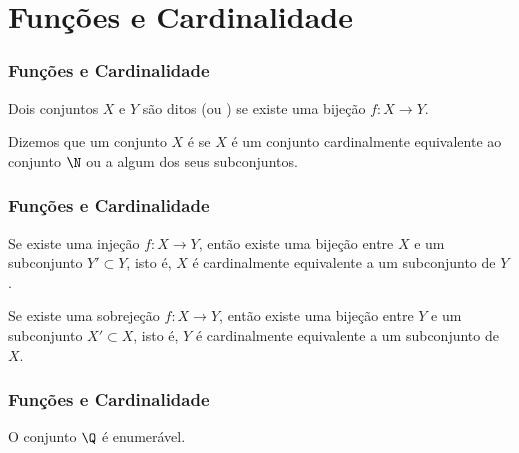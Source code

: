 \documentclass[brazil, notheorems, 10pt]{beamer}
\begin{document}
\section{Funções e Cardinalidade}
\begin{frame}
\frametitle{Funções e Cardinalidade} %

\begin{definicao}
Dois conjuntos $X$ e $Y$ são ditos 
(ou ) se existe uma bijeção $f : X \to Y$.
\end{definicao}

\begin{definicao}
Dizemos que um conjunto $X$ é  se $X$ é um conjunto
cardinalmente equivalente ao conjunto $\N$ ou a algum dos seus
subconjuntos.
\end{definicao}


\end{frame}




\begin{frame}
\frametitle{Funções e Cardinalidade} %

\begin{teorema}
Se existe uma injeção $f: X \to Y$, então existe uma bijeção entre
$X$ e um subconjunto $Y' \subset Y$, isto é, $X$ é cardinalmente
equivalente a um subconjunto de $Y$.
\end{teorema} \pause

\begin{teorema}
Se existe uma sobrejeção $f : X \to Y$, então existe uma bijeção
entre $Y$ e um subconjunto $X' \subset X$, isto é, $Y$ é
cardinalmente equivalente a um subconjunto de $X$.
\end{teorema}

\end{frame}


\begin{frame}
\frametitle{Funções e Cardinalidade} %

\begin{exemplo}
O conjunto $\Q$ é enumerável.
\end{exemplo}

\end{frame}
\end{document}
